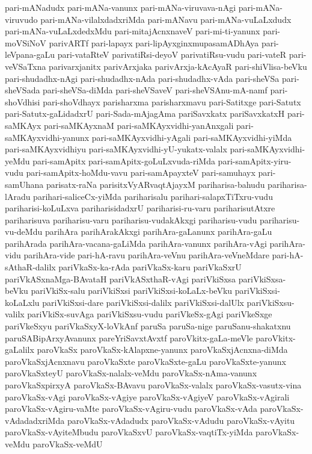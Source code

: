 {pari-mANadudx
pari-mANa-vanunx
pari-mANa-viruvava-nAgi
pari-mANa-viruvudo
pari-mANa-vilalxdadxriMda
pari-mANavu
pari-mANa-vuLaLxdudx
pari-mANa-vuLaLxdedxMdu
pari-mitajAcnxnaveV
pari-mi-ti-yanunx
pari-moVSiNoV
parivARTf
pari-lapayx
pari-lipAyxginxmupasamADhAya
pari-leVpana-gaLu
pari-vataRteV
parivatiRsi-deyoV
parivatiRsu-vudu
pari-vateR
pari-veVSaTxna
parivarxjanitx
parivArxjaka
parivArxja-kAcAyaR
pari-shiVlisa-beVku
pari-shudadhx-nAgi
pari-shudadhx-nAda
pari-shudadhx-vAda
pari-sheVSa
pari-sheVSada
pari-sheVSa-diMda
pari-sheVSaveV
pari-sheVSAnu-mA-namf
pari-shoVdhisi
pari-shoVdhayx
parisharxma
parisharxmavu
pari-Satitxge
pari-Satutx
pari-Satutx-gaLidadxrU
pari-Sada-mAjagAma
pariSavxkatx
pariSavxkatxH
pari-saMKAyx
pari-saMKAyxnaM
pari-saMKAyxvidhi-yanAnxgali
pari-saMKAyxvidhi-yanunx
pari-saMKAyxvidhi-yAgali
pari-saMKAyxvidhi-yiMda
pari-saMKAyxvidhiyu
pari-saMKAyxvidhi-yU-yukatx-valalx
pari-saMKAyxvidhi-yeMdu
pari-samApitx
pari-samApitx-goLuLxvuda-riMda
pari-samApitx-yiru-vudu
pari-samApitx-hoMdu-vavu
pari-samApayxteV
pari-samuhayx
pari-samUhana
parisatx-raNa
parisitxVyARvaqtAjayxM
pariharisa-bahudu
pariharisa-lAradu
parihari-saliceCx-yiMda
pariharisalu
parihari-salapxTiTxru-vudu
pariharisi-koLuLxva
pariharisidadxrU
pariharisi-ru-varu
pariharisutAtxre
pariharisuva
pariharisu-varu
pariharisu-vudakAkxgi
pariharisu-vudu
pariharisu-vu-deMdu
parihAra
parihArakAkxgi
parihAra-gaLanunx
parihAra-gaLu
parihArada
parihAra-vacana-gaLiMda
parihAra-vanunx
parihAra-vAgi
parihAra-vidu
parihAra-vide
pari-hA-ravu
parihAra-veVnu
parihAra-veVneMdare
pari-hA-sAthaR-dalilx
pariVkaSx-ka-rAda
pariVkaSx-karu
pariVkaSxrU
pariVkASxnaMga-BAvataH
pariVkASxthaR-vAgi
pariVkiSxsa
pariVkiSxsa-beVku
pariVkiSx-salu
pariVkiSxsi
pariVkiSxsi-koLaLx-beVku
pariVkiSxsi-koLaLxlu
pariVkiSxsi-dare
pariVkiSxsi-dalilx
pariVkiSxsi-dalUlx
pariVkiSxsu-valilx
pariVkiSx-suvAga
pariVkiSxsu-vudu
pariVkeSx-gAgi
pariVkeSxge
pariVkeSxyu
pariVkaSxyX-loVkAnf
paruSa
paruSa-nige
paruSanu-shakatxnu
paruSABipArxyAvanunx
pareYriSavxtAvxtf
paroVkitx-gaLa-meVle
paroVkitx-gaLalilx
paroVkaSx
paroVkaSx-kAlapxne-yanunx
paroVkaSxjAcnxna-diMda
paroVkaSxjAcnxnavu
paroVkaSxte
paroVkaSxte-gaLu
paroVkaSxte-yanunx
paroVkaSxteyU
paroVkaSx-nalalx-veMdu
paroVkaSx-nAma-vanunx
paroVkaSxpirxyA
paroVkaSx-BAvavu
paroVkaSx-valalx
paroVkaSx-vasutx-vina
paroVkaSx-vAgi
paroVkaSx-vAgiye
paroVkaSx-vAgiyeV
paroVkaSx-vAgirali
paroVkaSx-vAgiru-vaMte
paroVkaSx-vAgiru-vudu
paroVkaSx-vAda
paroVkaSx-vAdadadxriMda
paroVkaSx-vAdadudx
paroVkaSx-vAdudu
paroVkaSx-vAyitu
paroVkaSx-vAyiteMbudu
paroVkaSxvU
paroVkaSx-vaqtiTx-yiMda
paroVkaSx-veMdu
paroVkaSx-veMdU
}
